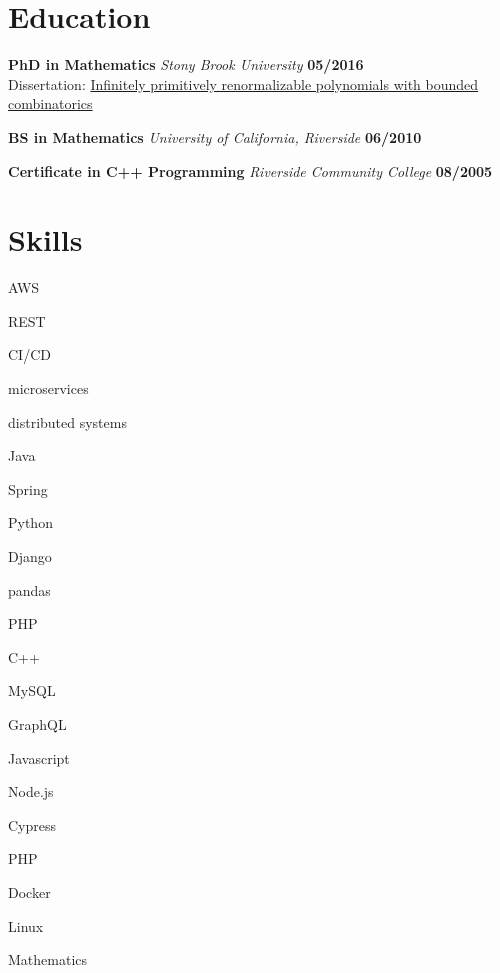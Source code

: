 \documentclass[11pt]{article}
\newcommand\verticalspace{\vspace{0.5cm}}
\begin{document}
\section*{Education}
\textbf{PhD in Mathematics} \emph{Stony Brook University} \hfill \textbf{05/2016}\\
Dissertation: \href{http://hdl.handle.net/11401/76376}{Infinitely primitively renormalizable polynomials with bounded combinatorics}

\verticalspace

\textbf{BS in Mathematics} \emph{University of California, Riverside} \hfill \textbf{06/2010}

\verticalspace

\textbf{Certificate in C++ Programming} \emph{Riverside Community College} \hfill \textbf{08/2005}

\section*{Skills}
\begin{inparaitem}
  \item AWS
  \item REST
  \item CI/CD
  \item microservices
  \item distributed systems
  \item Java
  \item Spring
  \item Python
  \item Django
  \item pandas
  \item PHP
  \item C++
  \item MySQL
  \item GraphQL
  \item Javascript
  \item Node.js
  \item Cypress
  \item PHP
  \item Docker
  \item Linux
  \item Mathematics
\end{inparaitem}
\end{document}
